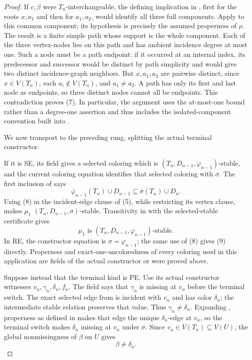 \begin{proof}
If \(c,\beta\) were \(T_n\)-interchangeable, the defining implication in
, first for the roots \(x,a_1\) and then for
\(a_1,a_2\), would identify all three full components.  Apply
 to this common component; its
hypothesis is precisely the assumed properness of \(\rho\).  The result
is a finite simple path whose support is the whole component.  Each of the
three vertex-nodes lies on this path and has ambient incidence degree at
most one.  Such a node must be a path endpoint: if it occurred at an
internal index, its predecessor and successor would be distinct by path
simplicity and would give two distinct incidence-graph neighbors.  But
\(x,a_1,a_2\) are pairwise distinct, since \(x\in V(T_n)\), each
\(a_i\notin V(T_n)\), and \(a_1\ne a_2\).  A path has only its first
and last node as endpoints, so three distinct nodes cannot all be
endpoints.  This contradiction proves (7).  In particular, the argument
uses the at-most-one bound rather than a degree-one assertion and thus
includes the isolated-component convention built into
.

We now transport to the preceding rung, splitting the actual terminal
constructor.

If it is SE, its  field gives a selected
coloring which is \((T_n,D_{n-1},\varphi_{n-1})\)-stable, and the current
coloring equation identifies that selected coloring with \(\sigma\).
The first inclusion of  says
\[
 \overline{\varphi}_{n-1}(T_n)\cup D_{n-1}
 \subseteq \overline\sigma(T_n)\cup D_n.                    \tag{8}
\]
Using (8) in the incident-edge clause of (5), while restricting its
vertex clause, makes \(\mu_1\)
\((T_n,D_{n-1},\sigma)\)-stable.  Transitivity in
 with the selected-stable certificate gives
\[
 \mu_1\text{ is }(T_n,D_{n-1},\varphi_{n-1})\text{-stable}.  \tag{9}
\]
In RE, the constructor equation is \(\sigma=\varphi_{n-1}\); the same
use of (8) gives (9) directly.  Properness and exact-one-uncoloredness of
every coloring used in this application are fields of the actual
constructor or were proved above.

Suppose instead that the terminal kind is PE.  Use its actual constructor
witnesses \(v_n,\gamma_n,\delta_n,f_n\).  The
 field says that \(\gamma_n\) is missing
at \(v_n\) before the terminal switch.  The exact selected edge from
 is incident with \(v_n\) and has color
\(\delta_n\); the intermediate stable relation preserves that value.
Thus \(\gamma_n\ne\delta_n\).  Expanding
, properness as defined in
 makes that edge the unique
\(\delta_n\)-edge at \(v_n\), so the terminal switch makes
\(\delta_n\) missing at \(v_n\) under \(\sigma\).  Since
\(v_n\in V(T_n)\subseteq V(U)\), the global nonmissingness of \(\beta\)
on \(U\) gives
\[
                             \beta\ne\delta_n.                \tag{10}
\]


\end{proof}
